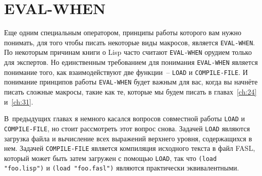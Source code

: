 \section{EVAL-WHEN}

Еще одним специальным оператором, принципы работы которого вам нужно понимать, для того
чтобы писать некоторые виды макросов, является \lstinline{EVAL-WHEN}.  По некоторым
причинам книги о Lisp часто считают \lstinline{EVAL-WHEN} орудием только для экспертов.
Но единственным требованием для понимания \lstinline{EVAL-WHEN} является понимание того,
как взаимодействуют две функции~-- \lstinline{LOAD} и \lstinline{COMPILE-FILE}.  И
понимание принципов работы \lstinline{EVAL-WHEN} будет важным для вас, когда вы начнёте
писать сложные макросы, такие как те, которые мы будем писать в главах~\ref{ch:24}
и~\ref{ch:31}.

В~предыдущих главах я немного касался вопросов совместной работы \lstinline{LOAD} и
\lstinline{COMPILE-FILE}, но стоит рассмотреть этот вопрос снова.  Задачей \lstinline{LOAD} являются
загрузка файла и вычисление всех выражений верхнего уровня, содержащихся в нем.  Задачей
\lstinline{COMPILE-FILE} является компиляция исходного текста в файл FASL, который может быть
затем загружен с помощью \lstinline{LOAD}, так что \lstinline{(load "foo.lisp")} и 
\lstinline{(load "foo.fasl")} являются практически эквивалентными.

